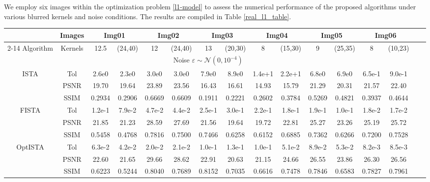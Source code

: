 \documentclass{article}
\begin{document}
We employ six images within the optimization problem \eqref{l1-model} to assess the numerical performance of the proposed algorithms under various blurred kernels and noise conditions. The results are compiled in Table \ref{real_l1_table}.

\begin{table*}[thp]
\begin{center}
	\fontsize{6}{11}\selectfont
	\setlength{\tabcolsep}{1.2mm}
	\caption{The numerical results for the optimization problem \eqref{l1-model} with different blurred kernels and noises under six compared algorithms. 
	} 
\label{real_l1_table}
\begin{tabular}{c|c|c c | cc | cc| cc| cc| cc cc } 
	\hline 
	 & Images & \multicolumn{2}{c|}{Img01} & \multicolumn{2}{c|}{Img02} & \multicolumn{2}{c|}{Img03} &  \multicolumn{2}{c|}{Img04} &\multicolumn{2}{c|}{Img05} &\multicolumn{2}{c}{Img06}\\\cline{2-14}
	Algorithm & Kernels& 12.5 &(24,40) & 12 & (24,40) & 13 & (20,30)  & 8 & (15,30) & 9  & (25,35) & 8 & (10,23)  \\\hline
    \multicolumn{14}{c}{Noise $\varepsilon\sim \mathcal{N}(0,10^{-4})$} \\\hline
\multirow{3}{*}{ISTA} & Tol & 2.6e0 &2.3e0 & 3.0e0 & 3.0e0  & 7.9e0 & 8.9e0 & 1.4e+1 & 2.2e+1 & 6.8e0 & 6.9e0 & 6.5e-1 & 9.0e-1  \\
	  & PSNR & 19.70 &19.64 & 23.89 & 23.56  & 16.43 & 16.61 & 14.93 & 15.79 & 21.29 & 20.31 &21.57 & 22.40\\ 
      & SSIM & 0.2934 &0.2906 & 0.6669 & 0.6609  & 0.1911 & 0.2221 & 0.2602 & 0.3784 & 0.5269 & 0.4821 & 0.3937 & 0.4644  \\\hline
\multirow{3}{*}{FISTA} & Tol & 1.2e-1 &7.9e-2 & 4.7e-2 & 4.4e-2  & 2.5e-1 & 3.0e-1 & 2.2e-1 & 1.8e-1 & 1.9e-1 & 1.0e-1 & 1.8e-2 & 1.7e-2  \\
	  & PSNR & 21.85 &21.23 & 28.59 & 27.69  & 21.56 & 19.64 & 19.72 & 22.81 & 25.27 & 23.26 & 25.19 & 25.72\\ 
      & SSIM & 0.5458 &0.4768 & 0.7816 & 0.7500  & 0.7466 & 0.6258 & 0.6152 & 0.6885 & 0.7362 & 0.6266 & 0.7200 & 0.7528  \\\hline
\multirow{3}{*}{OptISTA} & Tol & 6.3e-2 &4.2e-2 & 2.0e-2 & 2.1e-2  & 1.0e-1 & 1.3e-1 & 1.0e-1 & 5.1e-2 & 8.9e-2 & 5.3e-2 & 8.2e-3 & 8.5e-3  \\
	  & PSNR & 22.60 &21.65 & 29.66 & 28.62  & 22.91 & 20.63 & 21.15 & 24.66 & 26.55 & 23.86 & 26.30 & 26.56\\ 
      & SSIM & 0.6223 & 0.5244 & 0.8040 & 0.7689  & 0.8152 & 0.7035 & 0.6616 & 0.7478 & 0.7846 & 0.6583 & 0.7827 & 0.7961 \\\hline

\end{tabular}
\end{center}
\end{table*}
\end{document}
